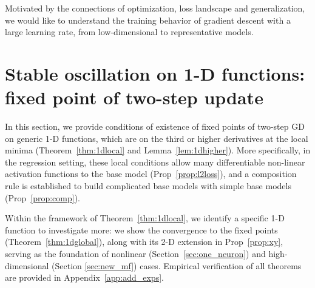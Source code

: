 \documentclass{article}
\newcommand{\citep}[1]{\cite{#1}}
\theoremstyle{plain}
\theoremstyle{remark}
\newcommand{\joan}[1]{}
\newcommand{\lei}[1]{\noindent{\color{red}{[Lei: #1]}}}
\begin{document}
Motivated by the connections of optimization, loss landscape and generalization, we would like to understand the training behavior of gradient descent with a large learning rate, from low-dimensional to representative models.







\section{Stable oscillation on 1-D functions: fixed point of two-step update}



In this section, we provide conditions of existence of fixed points of two-step GD on generic 1-D functions, which are on the third or higher derivatives at the local minima (Theorem~\ref{thm:1dlocal} and Lemma~\ref{lem:1dhigher}). More specifically, in the regression setting, these local conditions allow many differentiable non-linear activation functions to the base model (Prop~\ref{prop:l2loss}), and a composition rule is 
established to build complicated base models with simple base models (Prop~\ref{prop:comp}).

Within the framework of Theorem~\ref{thm:1dlocal}, we identify a specific 1-D function to investigate more:
we show the convergence to the fixed points (Theorem~\ref{thm:1dglobal}), along with its 2-D extension in Prop~\ref{prop:xy}, serving as the foundation of nonlinear (Section~\ref{sec:one_neuron}) and high-dimensional (Section \ref{sec:new_mf}) cases. Empirical verification of all theorems are provided in Appendix~\ref{app:add_exps}.
\end{document}
